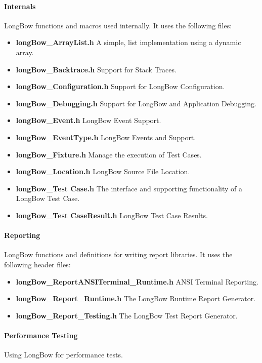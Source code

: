 \paragraph {Internals}
LongBow functions and macros used internally.
It uses the following files:

\begin{itemize}
 \item {\bf longBow\_ArrayList.h} A simple, list implementation using a dynamic array.  
 \item {\bf longBow\_Backtrace.h} Support for Stack Traces. 
 \item {\bf longBow\_Configuration.h} Support for LongBow Configuration. 
 \item {\bf longBow\_Debugging.h} Support for LongBow and Application Debugging. 
 \item {\bf longBow\_Event.h} LongBow Event Support. 
 \item {\bf longBow\_EventType.h} LongBow Events and Support. 
 \item {\bf longBow\_Fixture.h} Manage the execution of Test Cases. 
 \item {\bf longBow\_Location.h} LongBow Source File Location. 
 \item {\bf longBow\_Test Case.h} The interface and supporting functionality of a LongBow Test Case. 
 \item {\bf longBow\_Test CaseResult.h} LongBow Test Case Results. 
\end{itemize}
 
 
 \paragraph {Reporting}
LongBow functions and definitions for writing report libraries.  
It uses the following header files:

\begin{itemize}
 \item {\bf longBow\_ReportANSITerminal\_Runtime.h} ANSI Terminal Reporting.  
\item {\bf longBow\_Report\_Runtime.h} The LongBow Runtime Report Generator.  
\item {\bf longBow\_Report\_Testing.h} The LongBow Test Report Generator. 
\end{itemize}

 	
 \paragraph {Performance Testing}
Using LongBow for performance tests.


